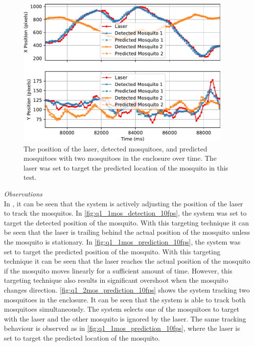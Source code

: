 \begin{figure}[h]
  \centering
  \includegraphics[width=0.95\textwidth]{figures/results/q1_2mos_prediction_10fps.pdf}
  \caption{The position of the laser, detected mosquitoes, and predicted mosquitoes with two mosquitoes in the enclosure over time. The laser was set to target the predicted location of the mosquito in this test.}
  \label{fig:q1_2mos_prediction_10fps}
\end{figure}

\textit{Observations}\\
In , it can be seen that the system is actively adjusting the position of the laser to track the mosquitos. In \autoref{fig:q1_1mos_detection_10fps}, the system was set to target the detected position of the mosquito. With this targeting technique it can be seen that the laser is trailing behind the actual position of the mosquito unless the mosquito is stationary. In \autoref{fig:q1_1mos_prediction_10fps}, the system was set to target the predicted position of the mosquito. With this targeting technique it can be seen that the laser reaches the actual position of the mosquito if the mosquito moves linearly for a sufficient amount of time. However, this targeting technique also results in significant overshoot when the mosquito changes direction. \autoref{fig:q1_2mos_prediction_10fps} shows the system tracking two mosquitoes in the enclosure. It can be seen that the system is able to track both mosquitoes simultaneously. The system selects one of the mosquitoes to target with the laser and the other mosquito is ignored by the laser. The same tracking behaviour is observed as in \autoref{fig:q1_1mos_prediction_10fps}, where the laser is set to target the predicted location of the mosquito.

